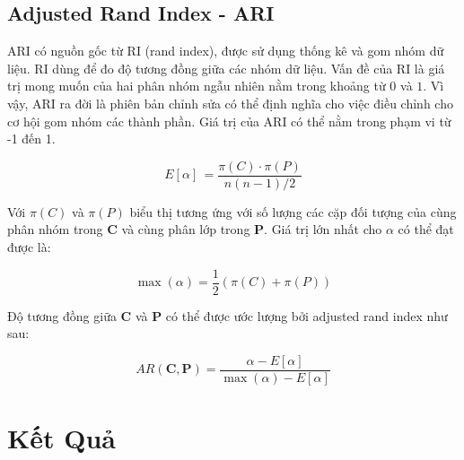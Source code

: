 \subsection{Adjusted Rand Index - ARI}
\hspace{10mm}ARI có nguồn gốc từ RI (rand index), được sử dụng thống kê và gom nhóm dữ liệu. RI dùng để đo độ tương đồng giữa các nhóm dữ liệu. Vấn đề của RI là giá trị mong muốn của hai phân nhóm ngẫu nhiên nằm trong khoảng từ $0$ và $1$. Vì vậy, ARI ra đời là phiên bản chỉnh sửa có thể định nghĩa cho việc điều chỉnh cho cơ hội gom nhóm các thành phần. Giá trị của ARI có thể nằm trong phạm vi từ -1 đến 1.
\begin{center}
\begin{equation}
E[\alpha] \, = \frac{\pi(C) \cdot \pi(P)}{n(n - 1) / 2}
\end{equation}
\end{center}
\hspace{10mm}Với $\pi(C)$ và $\pi(P)$ biểu thị tương ứng với số lượng các cặp đối tượng của cùng phân nhóm trong $\textbf{C}$ và cùng phân lớp trong $\textbf{P}$. Giá trị lớn nhất cho $\alpha$ có thể đạt được là:
\begin{center}
\begin{equation}
\max(\alpha) = \frac{1}{2} (\pi(C) + \pi(P))
\end{equation}
\end{center}
\hspace{10mm}Độ tương đồng giữa $\textbf{C}$ và $\textbf{P}$ có thể được ước lượng bởi adjusted rand index như sau:
\begin{center}
\begin{equation}
AR(\textbf{C}, \textbf{P}) = \frac{\alpha - E[\alpha]}{\max(\alpha) - E[\alpha]}
\end{equation}
\end{center}

\section{Kết Quả}